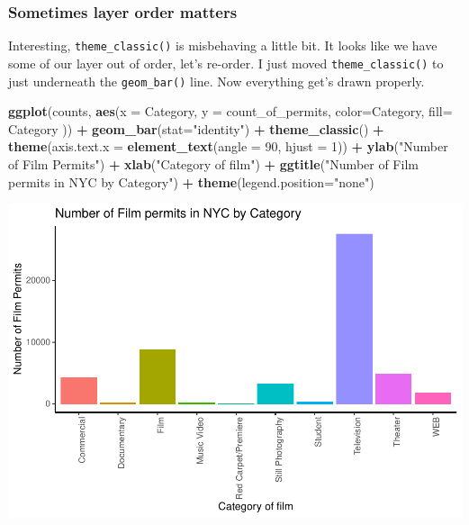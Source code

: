 \documentclass[
]{book}
\newenvironment{Shaded}{\begin{snugshade}}{\end{snugshade}}
\newcommand{\AttributeTok}[1]{\textcolor[rgb]{0.13,0.29,0.53}{#1}}
\newcommand{\DecValTok}[1]{\textcolor[rgb]{0.00,0.00,0.81}{#1}}
\newcommand{\FunctionTok}[1]{\textcolor[rgb]{0.13,0.29,0.53}{\textbf{#1}}}
\newcommand{\NormalTok}[1]{#1}
\newcommand{\SpecialCharTok}[1]{\textcolor[rgb]{0.81,0.36,0.00}{\textbf{#1}}}
\newcommand{\StringTok}[1]{\textcolor[rgb]{0.31,0.60,0.02}{#1}}
\begin{document}
\hypertarget{sometimes-layer-order-matters}{%
\subsubsection{Sometimes layer order matters}\label{sometimes-layer-order-matters}}

Interesting, \texttt{theme\_classic()} is misbehaving a little bit. It looks like we have some of our layer out of order, let's re-order. I just moved \texttt{theme\_classic()} to just underneath the \texttt{geom\_bar()} line. Now everything get's drawn properly.

\begin{Shaded}
\begin{Highlighting}[]
\FunctionTok{ggplot}\NormalTok{(counts, }\FunctionTok{aes}\NormalTok{(}\AttributeTok{x =}\NormalTok{ Category, }\AttributeTok{y =}\NormalTok{ count\_of\_permits, }
                   \AttributeTok{color=}\NormalTok{Category, }
                   \AttributeTok{fill=}\NormalTok{ Category )) }\SpecialCharTok{+}
  \FunctionTok{geom\_bar}\NormalTok{(}\AttributeTok{stat=}\StringTok{"identity"}\NormalTok{) }\SpecialCharTok{+} 
  \FunctionTok{theme\_classic}\NormalTok{() }\SpecialCharTok{+}
  \FunctionTok{theme}\NormalTok{(}\AttributeTok{axis.text.x =} \FunctionTok{element\_text}\NormalTok{(}\AttributeTok{angle =} \DecValTok{90}\NormalTok{, }\AttributeTok{hjust =} \DecValTok{1}\NormalTok{)) }\SpecialCharTok{+}
  \FunctionTok{ylab}\NormalTok{(}\StringTok{"Number of Film Permits"}\NormalTok{) }\SpecialCharTok{+} 
  \FunctionTok{xlab}\NormalTok{(}\StringTok{"Category of film"}\NormalTok{) }\SpecialCharTok{+}
  \FunctionTok{ggtitle}\NormalTok{(}\StringTok{"Number of Film permits in NYC by Category"}\NormalTok{) }\SpecialCharTok{+}
  \FunctionTok{theme}\NormalTok{(}\AttributeTok{legend.position=}\StringTok{"none"}\NormalTok{) }
\end{Highlighting}
\end{Shaded}

\includegraphics{Statistics_Lab_files/figure-latex/1categoryJ-1.pdf}
\end{document}
